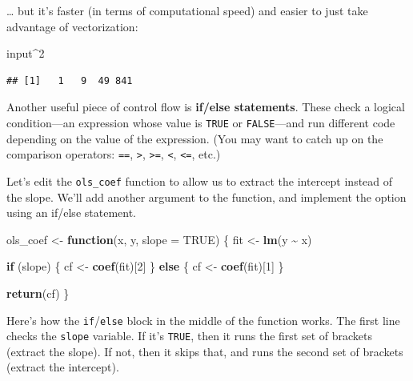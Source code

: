 \documentclass[
  12pt,
  oneside,openany]{book}
\newenvironment{Shaded}{\begin{snugshade}}{\end{snugshade}}
\newcommand{\ControlFlowTok}[1]{\textcolor[rgb]{0.13,0.29,0.53}{\textbf{#1}}}
\newcommand{\DataTypeTok}[1]{\textcolor[rgb]{0.13,0.29,0.53}{#1}}
\newcommand{\DecValTok}[1]{\textcolor[rgb]{0.00,0.00,0.81}{#1}}
\newcommand{\KeywordTok}[1]{\textcolor[rgb]{0.13,0.29,0.53}{\textbf{#1}}}
\newcommand{\NormalTok}[1]{#1}
\newcommand{\OperatorTok}[1]{\textcolor[rgb]{0.81,0.36,0.00}{\textbf{#1}}}
\newcommand{\OtherTok}[1]{\textcolor[rgb]{0.56,0.35,0.01}{#1}}
\newcommand{\StringTok}[1]{\textcolor[rgb]{0.31,0.60,0.02}{#1}}
\begin{document}
\ldots{} but it's faster (in terms of computational speed) and easier to just take advantage of vectorization:

\begin{Shaded}
\begin{Highlighting}[]
\NormalTok{input}\OperatorTok{\^{}}\DecValTok{2}
\end{Highlighting}
\end{Shaded}

\begin{verbatim}
## [1]   1   9  49 841
\end{verbatim}

Another useful piece of control flow is \textbf{if/else statements}. These check a logical condition---an expression whose value is \texttt{TRUE} or \texttt{FALSE}---and run different code depending on the value of the expression. (You may want to catch up on the comparison operators: \texttt{==}, \texttt{\textgreater{}}, \texttt{\textgreater{}=}, \texttt{\textless{}}, \texttt{\textless{}=}, etc.)

Let's edit the \texttt{ols\_coef} function to allow us to extract the intercept instead of the slope. We'll add another argument to the function, and implement the option using an if/else statement.

\begin{Shaded}
\begin{Highlighting}[]
\NormalTok{ols\_coef <{-}}\StringTok{ }\ControlFlowTok{function}\NormalTok{(x, y, }\DataTypeTok{slope =} \OtherTok{TRUE}\NormalTok{) \{}
\NormalTok{  fit <{-}}\StringTok{ }\KeywordTok{lm}\NormalTok{(y }\OperatorTok{\textasciitilde{}}\StringTok{ }\NormalTok{x)}

  \ControlFlowTok{if}\NormalTok{ (slope) \{}
\NormalTok{    cf <{-}}\StringTok{ }\KeywordTok{coef}\NormalTok{(fit)[}\DecValTok{2}\NormalTok{]}
\NormalTok{  \} }\ControlFlowTok{else}\NormalTok{ \{}
\NormalTok{    cf <{-}}\StringTok{ }\KeywordTok{coef}\NormalTok{(fit)[}\DecValTok{1}\NormalTok{]}
\NormalTok{  \}}

  \KeywordTok{return}\NormalTok{(cf)}
\NormalTok{\}}
\end{Highlighting}
\end{Shaded}

Here's how the \texttt{if}/\texttt{else} block in the middle of the function works.
The first line checks the \texttt{slope} variable.
If it's \texttt{TRUE}, then it runs the first set of brackets (extract the slope).
If not, then it skips that, and runs the second set of brackets (extract the intercept).
\end{document}
